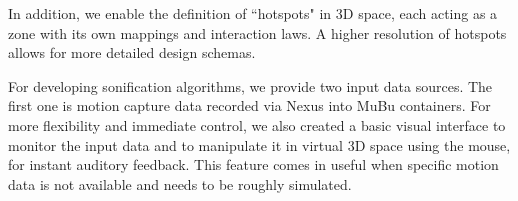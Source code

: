 


In addition, we enable the definition of ``hotspots" in 3D space, each acting as a zone with its own mappings and interaction laws. A higher resolution of hotspots allows for more detailed design schemas.


For developing sonification algorithms, we provide two input data sources. The first one is motion capture data recorded via Nexus into MuBu containers. For more flexibility and immediate control, we also created a basic visual interface to monitor the input data and to manipulate it in virtual 3D space using the mouse, for instant auditory feedback. This feature comes in useful when specific motion data is not available and needs to be roughly simulated.

